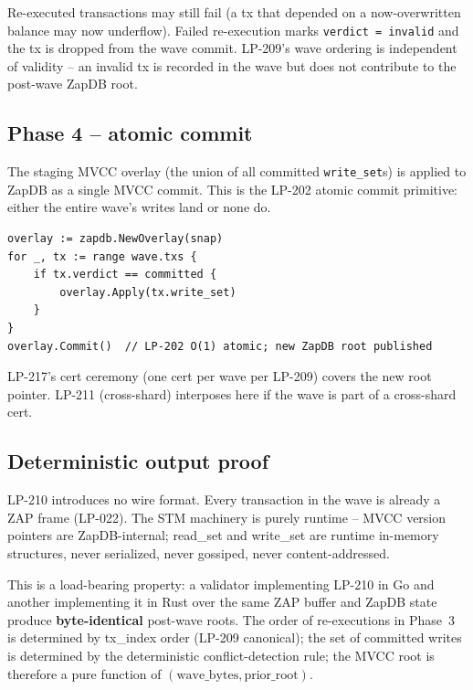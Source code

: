 Re-executed transactions may still fail (a tx that depended on a
now-overwritten balance may now underflow). Failed re-execution
marks \texttt{verdict = invalid} and the tx is dropped from the wave
commit. LP-209's wave ordering is independent of validity -- an
invalid tx is recorded in the wave but does not contribute to the
post-wave ZapDB root.

\subsection{Phase 4 -- atomic commit}

The staging MVCC overlay (the union of all committed
\texttt{write\_set}s) is applied to ZapDB as a single MVCC commit.
This is the LP-202 atomic commit primitive: either the entire wave's
writes land or none do.

\begin{verbatim}
overlay := zapdb.NewOverlay(snap)
for _, tx := range wave.txs {
    if tx.verdict == committed {
        overlay.Apply(tx.write_set)
    }
}
overlay.Commit()  // LP-202 O(1) atomic; new ZapDB root published
\end{verbatim}

LP-217's cert ceremony (one cert per wave per LP-209) covers the
new root pointer. LP-211 (cross-shard) interposes here if the wave
is part of a cross-shard cert.

\subsection{Deterministic output proof}

LP-210 introduces no wire format. Every transaction in the wave is
already a ZAP frame (LP-022). The STM machinery is purely runtime
-- MVCC version pointers are ZapDB-internal; read\_set and
write\_set are runtime in-memory structures, never serialized,
never gossiped, never content-addressed.

This is a load-bearing property: a validator implementing LP-210 in
Go and another implementing it in Rust over the same ZAP buffer and
ZapDB state produce \textbf{byte-identical} post-wave roots. The
order of re-executions in Phase~3 is determined by tx\_index order
(LP-209 canonical); the set of committed writes is determined by
the deterministic conflict-detection rule; the MVCC root is
therefore a pure function of $(\textrm{wave\_bytes},
\textrm{prior\_root})$.
